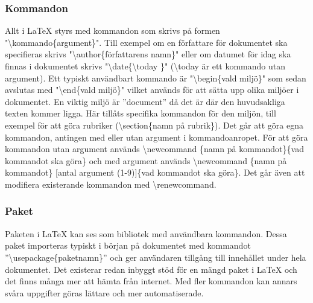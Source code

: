 \subsubsection{Kommandon}
Allt i {\LaTeX} styrs med kommandon som skrivs på formen "\textbackslash kommando\{argument\}". Till exempel om en författare för dokumentet ska specifieras skrivs "\textbackslash author\{författarens namn\}" \hspace{0.2mm} eller om datumet för idag ska finnas i dokumentet skrivs "\textbackslash date\{\textbackslash today \}" \hspace{0.2mm} (\textbackslash today är ett kommando utan argument). Ett typiskt användbart kommando är "\textbackslash begin\{vald miljö\}" \hspace{0.2mm} som sedan avslutas med "\textbackslash end\{vald miljö\}" \hspace{0.2mm} vilket används för att sätta upp olika miljöer i dokumentet. En viktig miljö är ''document''  då det är där den huvudsakliga texten kommer ligga. Här tillåts specifika kommandon för den miljön, till exempel för att göra rubriker (\textbackslash section\{namn på rubrik\}). \citep{latexandfriends}
\newline
\newline
Det går att göra egna kommandon, antingen med eller utan argument i kommandoanropet. För att göra kommandon utan argument används \textbackslash newcommand \{namn på kommandot\}\{vad kommandot ska göra\} och med argument används \textbackslash newcommand \{namn på kommandot\} [antal argument (1-9)]\{vad kommandot ska göra\}. Det går även att modifiera existerande kommandon med \textbackslash renewcommand. \citep{latexandfriends}    

\subsubsection{Paket}
Paketen i {\LaTeX} kan ses som bibliotek med användbara kommandon. Dessa paket importeras typiskt i början på dokumentet med kommandot ''\textbackslash usepackage\{paketnamn\}'' och ger användaren tillgång till innehållet under hela dokumentet. Det existerar redan inbyggt stöd för en mängd paket i {\LaTeX} och det finns många mer att hämta från internet. Med fler kommandon kan annars svåra uppgifter göras lättare och mer automatiserade. \citep{latexandfriends} 

